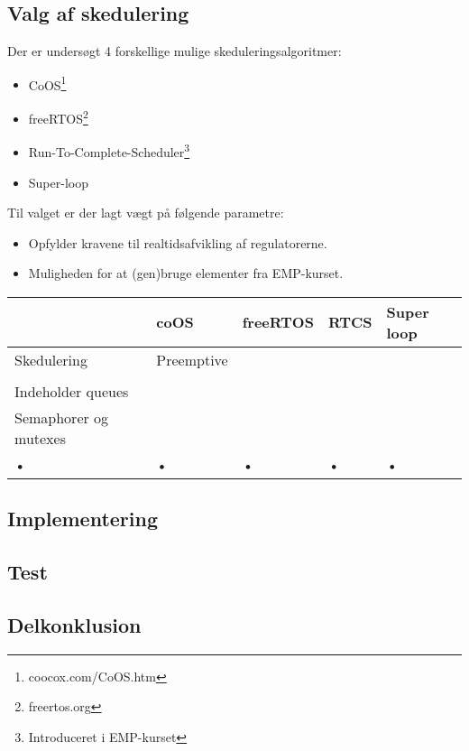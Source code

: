 \subsection{Valg af skedulering}
Der er undersøgt 4 forskellige mulige skeduleringsalgoritmer: 

\begin{itemize}
	\item CoOS\footnote{coocox.com/CoOS.htm}
	\item freeRTOS\footnote{freertos.org}
	\item Run-To-Complete-Scheduler\footnote{Introduceret i EMP-kurset}
	\item Super-loop
\end{itemize}

Til valget er der lagt vægt på følgende parametre: 

\begin{itemize}
	\item Opfylder kravene til realtidsafvikling af regulatorerne. 
	\item Muligheden for at (gen)bruge elementer fra EMP-kurset.
\end{itemize}


\begin{tabular}{|l|l|l|l|l|}
\hline 
 & coOS & freeRTOS & RTCS & Super loop \\ 
\hline 
Skedulering & Preemptive  &   &   &   \\ 
									\\
\hline 
Indeholder queues &   &   &   &   \\ 
\hline 
Semaphorer og mutexes &   &   &   &   \\ 
\hline 
• & • & • & • & • \\ 
\hline 
\end{tabular} 


\subsection{Implementering}
\subsection{Test} 
\subsection{Delkonklusion}

